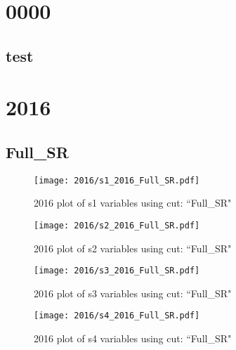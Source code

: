 \documentclass{article}
\begin{document}
    \graphicspath{ {../../plots/} }
    \listoffigures
    \section*{0000}
      \subsection*{test}
    \section*{2016}
      \subsection*{Full\_SR}
                        \begin{figure}[H]
                            \centering
                            \caption{2016 plot of s1 variables using cut: ``Full\_SR"}
                            \texttt{[image: 2016/s1\_2016\_Full\_SR.pdf]}
                        \end{figure}    
                        \begin{figure}[H]
                            \centering
                            \caption{2016 plot of s2 variables using cut: ``Full\_SR"}
                            \texttt{[image: 2016/s2\_2016\_Full\_SR.pdf]}
                        \end{figure}    
                        \begin{figure}[H]
                            \centering
                            \caption{2016 plot of s3 variables using cut: ``Full\_SR"}
                            \texttt{[image: 2016/s3\_2016\_Full\_SR.pdf]}
                        \end{figure}    
                        \begin{figure}[H]
                            \centering
                            \caption{2016 plot of s4 variables using cut: ``Full\_SR"}
                            \texttt{[image: 2016/s4\_2016\_Full\_SR.pdf]}
                        \end{figure}    
\end{document}
